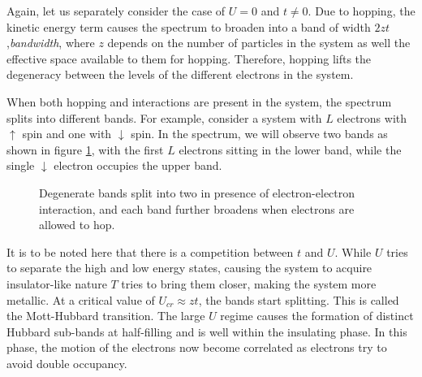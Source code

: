 \documentclass[]{report}
\begin{document}
Again, let us separately consider the case of $ U = 0 $ and $ t \ne 0 $. Due to hopping, the kinetic energy term causes the spectrum to broaden into a band of width $ 2zt $,\textit{bandwidth}, where $ z $ depends on the number of particles in the system as well the effective space available to them for hopping. Therefore, hopping lifts the degeneracy between the levels of the different electrons in the system.

When both hopping and interactions are present in the system, the spectrum splits into different bands. For example, consider a system with $ L $ electrons with $ \uparrow $ spin and one with $ \downarrow $ spin. In the spectrum, we will observe two bands as shown in figure \ref{fig:splitting}, with the first $ L $ electrons sitting in the lower band, while the single $ \downarrow $ electron occupies the upper band.

\begin{figure}[h!]
	\centering
	\caption{Degenerate bands split into two in presence of electron-electron interaction, and each band further broadens when electrons are allowed to hop.}\label{fig:splitting}
\end{figure}

It is to be noted here that there is a competition between $ t $ and $ U $. While $ U $ tries to separate the high and low energy states, causing the system to acquire insulator-like nature $ T $ tries to bring them closer, making the system more metallic. At a critical value of $ U_{cr} \approx zt $, the bands start splitting. This is called the Mott-Hubbard transition. The large $ U $ regime causes the formation of distinct Hubbard sub-bands at half-filling and is well within the insulating phase. In this phase, the motion of the electrons now become correlated as electrons try to avoid double occupancy.
\end{document}
